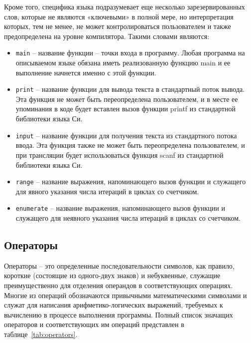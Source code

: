 Кроме того, специфика языка подразумевает еще несколько зарезервированных слов, которые не являются «ключевыми» в полной мере, но интерпретация которых, тем не менее, не может контролироваться пользователем и также предопределена на уровне компилятора.
Такими словами являются:

\begin{itemize}
    \item \verb|main| -- название функции -- точки входа в программу. Любая программа на описываемом языке обязана иметь реализованную функцию main и ее выполнение начнется именно с этой функции.
    \item \verb|print| -- название функции для вывода текста в стандартный поток вывода. Эта функция не может быть переопределена пользователем, и в месте ее упоминания в коде будет вставлен вызов функции printf из стандартной библиотеки языка Си.
    \item \verb|input| -- название функции для получения текста из стандартного потока ввода. Эта функция также не может быть переопределена пользователем, и при трансляции будет использоваться функция scanf из стандартной библиотеки языка Си.
    \item \verb|range| -- название выражения, напоминающего вызов функции и служащего для явного указания числа итераций в циклах со счетчиком.
    \item \verb|enumerate| -- название выражения, напоминающего вызов функции и служащего для неявного указания числа итераций в циклах со счетчиком.
\end{itemize}

\subsection{Операторы}
\label{sec:operators}

Операторы -- это определенные последовательности символов, как правило, короткие (состоящие из одного-двух знаков) и небуквенные, служащие преимущественно для отделения операндов в соответствующих операциях.
Многие из операций обозначаются привычными математическими символами и служат для написания арифметико-логических выражений, требуемых к вычислению в процессе выполнения программы.
Полный список значащих операторов и соответствующих им операций представлен в таблице~\ref{tab:operators}.

